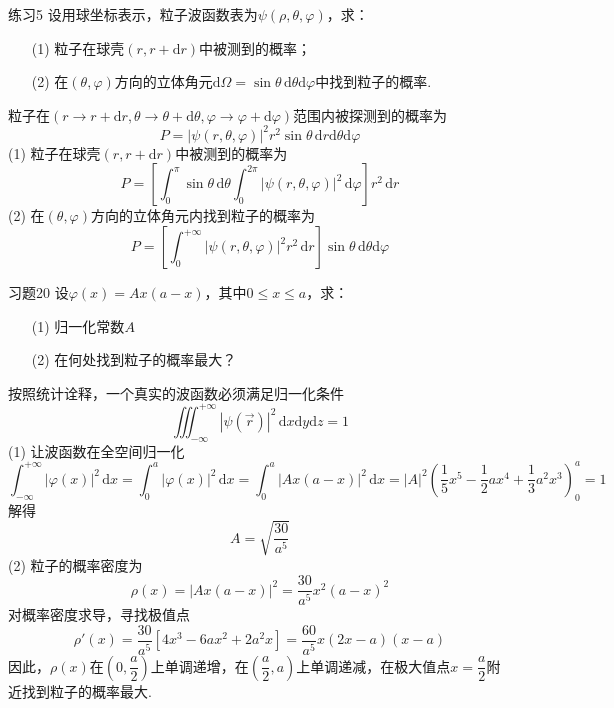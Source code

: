 \begin{question}{练习5}
    设用球坐标表示，粒子波函数表为$\psi(\rho, \theta, \varphi)$，求：
    \begin{enumerate}
        \item[(1)] 粒子在球壳$(r, r+\mathrm{d}r)$中被测到的概率；
        \item[(2)] 在$(\theta, \varphi)$方向的立体角元$\mathrm{d}\Omega=\sin\theta\,\mathrm{d}\theta\mathrm{d}\varphi$中找到粒子的概率.
    \end{enumerate}
\end{question}
\begin{solution}
    粒子在$(r\to r+\mathrm{d}r, \theta \to \theta+\mathrm{d}\theta, \varphi \to \varphi+\mathrm{d}\varphi)$范围内被探测到的概率为
    $$
        P = \left|\psi(r, \theta, \varphi)\right|^2r^2\sin\theta \,\mathrm{d}r\mathrm{d}\theta\mathrm{d}\varphi
    $$
    (1) 粒子在球壳$(r, r+\mathrm{d}r)$中被测到的概率为
    $$
        P=\left[\int_{0}^{\pi}\sin\theta\,\mathrm{d}\theta\int_{0}^{2\pi}\left|\psi(r, \theta, \varphi)\right|^2\,\mathrm{d}\varphi\right]r^2\,\mathrm{d}r
    $$
    (2) 在$(\theta, \varphi)$方向的立体角元内找到粒子的概率为
    $$
        P=\left[\int_{0}^{+\infty}\left|\psi(r, \theta, \varphi)\right|^2r^2\,\mathrm{d}r\right]\sin\theta\,\mathrm{d}\theta\mathrm{d}\varphi
    $$
\end{solution}


\begin{question}{习题20}
    设$\varphi(x)=Ax(a-x)$，其中$0 \leqslant x \leqslant a$，求：
    \begin{enumerate}
        \item[(1)] 归一化常数$A$
        \item[(2)] 在何处找到粒子的概率最大？
    \end{enumerate}
\end{question}
\begin{solution}
    按照统计诠释，一个真实的波函数必须满足归一化条件
    \begin{equation}\label{波函数归一化条件}
        \iiint_{-\infty}^{+\infty}|\psi(\vec{r})|^2\,\mathrm{d}x\mathrm{d}y\mathrm{d}z=1
    \end{equation}
    (1) 让波函数在全空间归一化
    $$
        \int_{-\infty}^{+\infty}|\varphi(x)|^2\,\mathrm{d}x
        = \int_0^a |\varphi(x)|^2\,\mathrm{d}x
        = \int_0^a |Ax(a-x)|^2\,\mathrm{d}x
        = |A|^2\left(\frac15x^5-\frac12ax^4+\frac13a^2x^3\right)_0^a
        = 1
    $$
    解得
    $$
        A=\sqrt{\frac{30}{a^5}}
    $$
    (2) 粒子的概率密度为
    $$
        \rho(x) = |Ax(a-x)|^2 = \frac{30}{a^5}x^2(a-x)^2
    $$
    对概率密度求导，寻找极值点
    $$
        \rho'(x)=\frac{30}{a^5}[4x^3-6ax^2+2a^2x]=\frac{60}{a^5}x(2x-a)(x-a)
    $$
    因此，$\rho(x)$在$\left(0,\dfrac{a}{2}\right)$上单调递增，在$\left(\dfrac{a}{2},a\right)$上单调递减，在极大值点$x=\dfrac{a}{2}$附近找到粒子的概率最大.
\end{solution}



